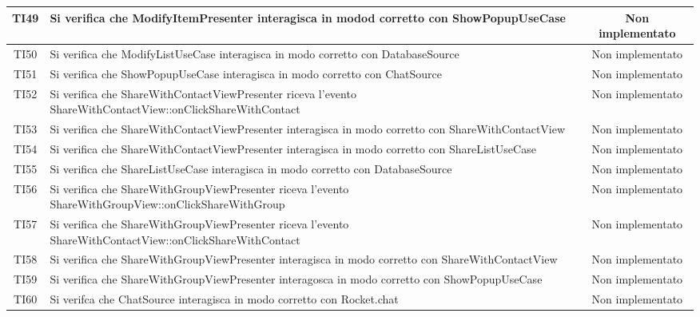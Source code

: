 \begin{center}
\begin{longtable}{|c|>{\centering}m{10cm}|c|}
		TI49 & Si verifica che ModifyItemPresenter interagisca in modod corretto con ShowPopupUseCase & Non implementato \\ \hline
		TI50 & Si verifica che ModifyListUseCase interagisca in modo corretto con DatabaseSource & Non implementato \\ \hline
		TI51 & Si verifica che ShowPopupUseCase interagisca in modo corretto con ChatSource & Non implementato \\ \hline
		TI52 & Si verifica che ShareWithContactViewPresenter riceva l'evento ShareWithContactView::onClickShareWithContact & Non implementato \\ \hline
		TI53 & Si verifica che ShareWithContactViewPresenter interagisca in modo corretto con ShareWithContactView & Non implementato \\ \hline
		TI54 & Si verifica che ShareWithContactViewPresenter interagisca in modo corretto con ShareListUseCase & Non implementato \\ \hline
		TI55 & Si verifica che ShareListUseCase interagisca in modo corretto con DatabaseSource & Non implementato \\ \hline
		TI56 & Si verifica che ShareWithGroupViewPresenter riceva l'evento ShareWithGroupView::onClickShareWithGroup & Non implementato \\ \hline
		TI57 & Si verifica che ShareWithGroupViewPresenter riceva l'evento ShareWithContactView::onClickShareWithContact & Non implementato \\ \hline
		TI58 & Si verifica che ShareWithGroupViewPresenter interagisca in modo corretto con ShareWithContactView & Non implementato \\ \hline
		TI59 & Si verifica che ShareWithGroupViewPresenter interagosca in modo corretto con ShowPopupUseCase & Non implementato \\ \hline
		TI60 & Si verifca che ChatSource interagisca in modo corretto con Rocket.chat & Non implementato \\ \hline
	\end{longtable}
\end{center}
